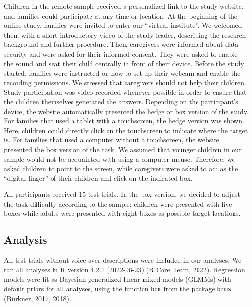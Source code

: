 \documentclass[
  man,floatsintext]{apa6}
\begin{document}
Children in the remote sample received a personalized link to the study website, and families could participate at any time or location.
At the beginning of the online study, families were invited to enter our ``virtual institute''.
We welcomed them with a short introductory video of the study leader, describing the research background and further procedure.
Then, caregivers were informed about data security and were asked for their informed consent.
They were asked to enable the sound and seat their child centrally in front of their device.
Before the study started, families were instructed on how to set up their webcam and enable the recording permissions.
We stressed that caregivers should not help their children.
Study participation was video recorded whenever possible in order to ensure that the children themselves generated the answers.
Depending on the participant's device, the website automatically presented the hedge or box version of the study.
For families that used a tablet with a touchscreen, the hedge version was shown.
Here, children could directly click on the touchscreen to indicate where the target is.
For families that used a computer without a touchscreen, the website presented the box version of the task.
We assumed that younger children in our sample would not be acquainted with using a computer mouse.
Therefore, we asked children to point to the screen, while caregivers were asked to act as the ``digital finger'' of their children and click on the indicated box.

All participants received 15 test trials.
In the box version, we decided to adjust the task difficulty according to the sample: children were presented with five boxes while adults were presented with eight boxes as possible target locations.

\hypertarget{analysis}{%
\subsection{Analysis}\label{analysis}}

All test trials without voice-over descriptions were included in our analyses.
We ran all analyses in R version 4.2.1 (2022-06-23) (R Core Team, 2022).
Regression models were fit as Bayesian generalized linear mixed models (GLMMs) with default priors for all analyses, using the function \texttt{brm} from the package \texttt{brms} (Bürkner, 2017, 2018).
\end{document}
